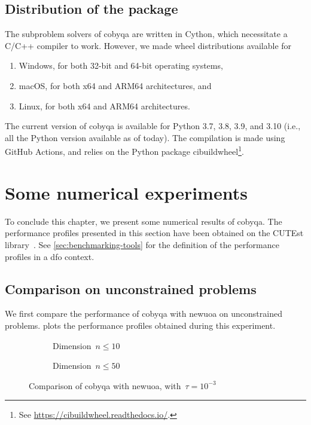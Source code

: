 \subsection{Distribution of the package}

The subproblem solvers of \gls{cobyqa} are written in Cython, which necessitate a C/C++ compiler to work.
However, we made wheel distributions available for
\begin{enumerate}
    \item Windows, for both 32-bit and 64-bit operating systems,
    \item macOS, for both x64 and ARM64 architectures, and
    \item Linux, for both x64 and ARM64 architectures.
\end{enumerate}
The current version of \gls{cobyqa} is available for Python 3.7, 3.8, 3.9, and 3.10 (i.e., all the Python version available as of today).
The compilation is made using GitHub Actions, and relies on the Python package cibuildwheel\footnote{See \url{https://cibuildwheel.readthedocs.io/}.}.

\section{Some numerical experiments}
\label{sec:cobyqa-experiments}

To conclude this chapter, we present some numerical results of \gls{cobyqa}.
The performance profiles presented in this section have been obtained on the CUTEst library~\cite{Gould_Orban_Toint_2015}.
See \cref{sec:benchmarking-tools} for the definition of the performance profiles in a \gls{dfo} context.

\subsection{Comparison on unconstrained problems}

We first compare the performance of \gls{cobyqa} with \gls{newuoa} on unconstrained problems.
 plots the performance profiles obtained during this experiment.

\begin{figure}[ht]
    \centering
    \begin{subfigure}[b]{0.49\textwidth}
        \centering
        \caption{Dimension~$n \le 10$}
    \end{subfigure}
    \hfill
    \begin{subfigure}[b]{0.49\textwidth}
        \centering
        \caption{Dimension~$n \le 50$}
    \end{subfigure}
    \caption{Comparison of \gls{cobyqa} with \gls{newuoa}, with~$\tau = 10^{-3}$}
    \label{fig:cobyqa-newuoa-unconstrained}
\end{figure}

